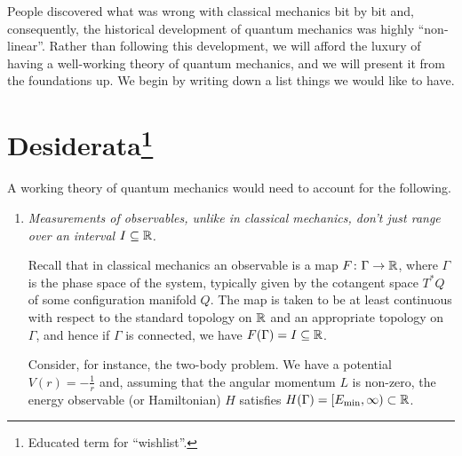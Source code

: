 
People discovered what was wrong with classical mechanics bit by bit and, consequently, the historical development of quantum mechanics was highly ``non-linear''. Rather than following this development, we will afford the luxury of having a well-working theory of quantum mechanics, and we will present it from the foundations up. We begin by writing down a list things we would like to have. 
\section[Desiderata]{Desiderata\protect\footnote{Educated term for ``wishlist''.}}

A working theory of quantum mechanics would need to account for the following.

\begin{enumerate}[label=(\alph*)]
\item \textit{Measurements of observables, unlike in classical mechanics, don't just range over an interval $I\subseteq \mathbb{R}$.}

Recall that in classical mechanics an observable is a map $F\colon\Gamma\to\mathbb{R}$, where $\Gamma$ is the phase space of the system, typically given by the cotangent space $T^*Q$ of some configuration manifold $Q$. The map is taken to be at least continuous with respect to the standard topology on $\mathbb{R}$ and an appropriate topology on $\Gamma$, and hence if $\Gamma$ is connected, we have $F(\Gamma)=I\subseteq\mathbb{R}$.

Consider, for instance, the two-body problem. We have a potential $V(r)=-\tfrac{1}{r}$ and, assuming that the angular momentum $L$ is non-zero, the energy observable (or Hamiltonian) $H$ satisfies $H(\Gamma)=[E_{\mathrm{min}},\infty)\subset \mathbb{R}$.


\end{enumerate}
